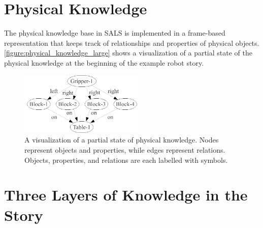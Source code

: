 \section{Physical Knowledge}

The physical knowledge base in SALS is implemented in a frame-based
representation that keeps track of relationships and properties of
physical objects.  {\autoref{figure:physical_knowledge_large}} shows a
visualization of a partial state of the physical knowledge at the
beginning of the example robot story.
\begin{figure}
  \center
  \includegraphics[width=6cm]{gfx/physical_knowledge_large}
  \caption[A visualization of a partial state of physical
    knowledge.]{A visualization of a partial state of physical
    knowledge.  Nodes represent objects and properties, while edges
    represent relations.  Objects, properties, and relations are each
    labelled with symbols.}
  \label{figure:physical_knowledge_large}
\end{figure}

\section{Three Layers of Knowledge in the Story}

